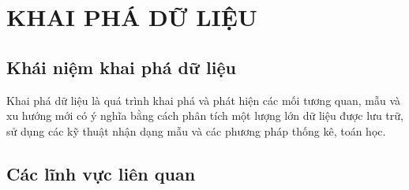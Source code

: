 \section{KHAI PHÁ DỮ LIỆU}

\subsection{Khái niệm khai phá dữ liệu}
Khai phá dữ liệu là quá trình khai phá và phát hiện các mối tương quan, mẫu và xu hướng mới có ý nghĩa bằng cách phân tích một lượng lớn dữ liệu được lưu trữ, sử dụng các kỹ thuật nhận dạng mẫu và các phương pháp thống kê, toán học.

\subsection{Các lĩnh vực liên quan}
